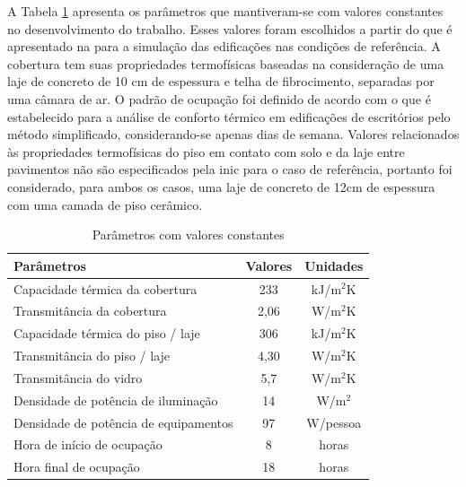 \documentclass[brazil,hardcopy,openany]{ufscthesis} %
\begin{document}
A Tabela \ref{table:paramconst} apresenta os parâmetros que mantiveram-se com valores constantes no desenvolvimento do trabalho. Esses valores foram escolhidos a partir do que é apresentado na  para a simulação das edificações nas condições de referência. A cobertura tem suas propriedades termofísicas baseadas na consideração de uma laje de concreto de 10 cm de espessura e telha de fibrocimento, separadas por uma câmara de ar. O padrão de ocupação foi definido de acordo com o que é estabelecido para a análise de conforto térmico em edificações de escritórios pelo método simplificado, considerando-se apenas dias de semana. Valores relacionados às propriedades termofísicas do piso em contato com solo e da laje entre pavimentos não são especificados pela \acrshort{inic} para o caso de referência, portanto foi considerado, para ambos os casos, uma laje de concreto de 12cm de espessura com uma camada de piso cerâmico.

\begin{table}[h]
	\centering
	\caption{Parâmetros com valores constantes}
	\label{table:paramconst}
	\begin{tabular}{|l |c |c |}
		\hline
		\textbf{Parâmetros} & \textbf{Valores} & \textbf{Unidades} \\
		\hline
		Capacidade térmica da cobertura & 233 & kJ/m$^2$K \\
		\hline
		Transmitância da cobertura & 2,06 & W/m$^2$K \\
		\hline
		Capacidade térmica do piso / laje & 306 & kJ/m$^2$K \\
		\hline
		Transmitância do piso / laje & 4,30 & W/m$^2$K \\
		\hline
		Transmitância do vidro & 5,7 & W/m$^2$K \\
		\hline 
		Densidade de potência de iluminação & 14 & W/m$^2$ \\
		\hline 
		Densidade de potência de equipamentos & 97 & W/pessoa \\
		\hline 
		Hora de início de ocupação & 8 & horas \\
		\hline 
		Hora final de ocupação & 18 & horas \\
		\hline 
	\end{tabular}
\end{table}
\end{document}
